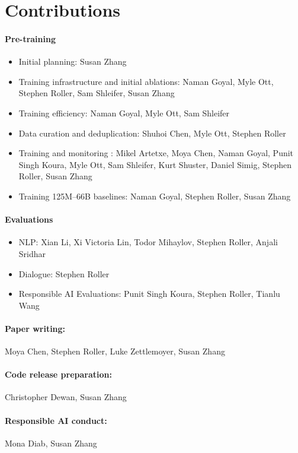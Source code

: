 
\section{Contributions}
\label{sec:contributions}
\paragraph{Pre-training}
    \begin{itemize}
        \item {Initial planning:} Susan Zhang
        \item {Training infrastructure and initial ablations:} Naman Goyal, Myle Ott, Stephen Roller, Sam Shleifer, Susan Zhang
        \item {Training efficiency:} Naman Goyal, Myle Ott, Sam Shleifer
        \item {Data curation and deduplication:} Shuhoi Chen, Myle Ott, Stephen Roller
        \item {Training and monitoring \OPT{}:} Mikel Artetxe, Moya Chen, Naman Goyal, Punit Singh Koura, Myle Ott, Sam Shleifer, Kurt Shuster, Daniel Simig, Stephen Roller, Susan Zhang
        \item {Training 125M--66B baselines:} Naman Goyal, Stephen Roller, Susan Zhang
    \end{itemize}
\paragraph{Evaluations} 
    \begin{itemize}
        \item {NLP:} Xian Li, Xi Victoria Lin, Todor Mihaylov, Stephen Roller, Anjali Sridhar
        \item {Dialogue:} Stephen Roller
        \item {Responsible AI Evaluations:} Punit Singh Koura, Stephen Roller, Tianlu Wang
    \end{itemize}
\paragraph{Paper writing:} Moya Chen, Stephen Roller, Luke Zettlemoyer, Susan Zhang
\paragraph{Code release preparation:} Christopher Dewan, Susan Zhang
\paragraph{Responsible AI conduct:} Mona Diab, Susan Zhang


